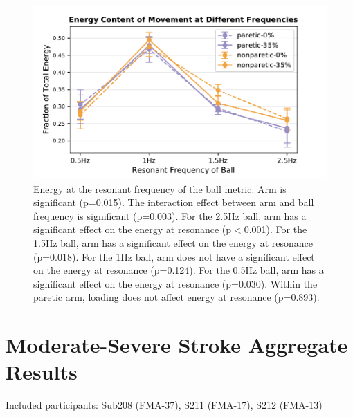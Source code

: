 \documentclass{article}
\begin{document}
\begin{figure}[!ht]
     \centering
     \includegraphics[width=0.5\linewidth]{Plots/e_at_res_raw.pdf}
	\caption{Energy at the resonant frequency of the ball metric. Arm is significant (p=0.015). The interaction effect between arm and ball frequency is significant (p=0.003). For the 2.5Hz ball, arm has a significant effect on the energy at resonance (p$<$0.001). For the 1.5Hz ball, arm has a significant effect on the energy at resonance (p=0.018). For the 1Hz ball, arm does not have a significant effect on the energy at resonance (p=0.124). For the 0.5Hz ball, arm has a significant effect on the energy at resonance (p=0.030). Within the paretic arm, loading does not affect energy at resonance (p=0.893).}
\end{figure}

\clearpage
\section{Moderate-Severe Stroke Aggregate Results}

Included participants: Sub208 (FMA-37), S211 (FMA-17), S212 (FMA-13)%
\end{document}
